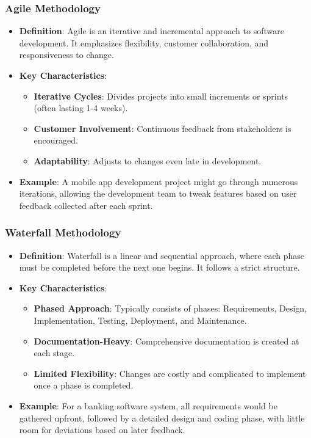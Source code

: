 \documentclass{beamer}
\begin{document}
\begin{frame}[fragile]
    \frametitle{Agile Methodology}
    \begin{itemize}
        \item \textbf{Definition}: Agile is an iterative and incremental approach to software development. It emphasizes flexibility, customer collaboration, and responsiveness to change.
        \item \textbf{Key Characteristics}:
        \begin{itemize}
            \item \textbf{Iterative Cycles}: Divides projects into small increments or sprints (often lasting 1-4 weeks).
            \item \textbf{Customer Involvement}: Continuous feedback from stakeholders is encouraged.
            \item \textbf{Adaptability}: Adjusts to changes even late in development.
        \end{itemize}
        \item \textbf{Example}: A mobile app development project might go through numerous iterations, allowing the development team to tweak features based on user feedback collected after each sprint.
    \end{itemize}
\end{frame}

\begin{frame}[fragile]
    \frametitle{Waterfall Methodology}
    \begin{itemize}
        \item \textbf{Definition}: Waterfall is a linear and sequential approach, where each phase must be completed before the next one begins. It follows a strict structure.
        \item \textbf{Key Characteristics}:
        \begin{itemize}
            \item \textbf{Phased Approach}: Typically consists of phases: Requirements, Design, Implementation, Testing, Deployment, and Maintenance.
            \item \textbf{Documentation-Heavy}: Comprehensive documentation is created at each stage.
            \item \textbf{Limited Flexibility}: Changes are costly and complicated to implement once a phase is completed.
        \end{itemize}
        \item \textbf{Example}: For a banking software system, all requirements would be gathered upfront, followed by a detailed design and coding phase, with little room for deviations based on later feedback.
    \end{itemize}
\end{frame}
\end{document}
